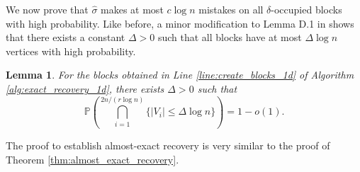 \documentclass{article}
\renewcommand{\P}{\mathbb{P}}
\newcommand{\1}{\mathbbm{1}}
\theoremstyle{definition}
\theoremstyle{plain}
\newtheorem{lemma}{Lemma}
\begin{document}
We now prove that $\hat{\sigma}$ makes at most $c \log n$ mistakes on all $\delta$-occupied blocks with high probability. Like before, a minor modification to Lemma D.1 in \cite{Gaudio+2025} shows that there exists a constant $\Delta > 0$ such that all blocks have at most $\Delta \log n$ vertices with high probability.

\begin{lemma}
\label{lem:maximum_vertices_per_block_1d}
For the blocks obtained in Line \ref{line:create_blocks_1d} of Algorithm \ref{alg:exact_recovery_1d}, there exists $\Delta > 0$ such that
\begin{equation*}
    \P(\bigcap_{i=1}^{2n/(r \log n)} \{|V_i| \leq \Delta \log n\}) = 1 - o(1).
\end{equation*}
\end{lemma}

The proof to establish almost-exact recovery is very similar to the proof of Theorem \ref{thm:almost_exact_recovery}.
\end{document}
